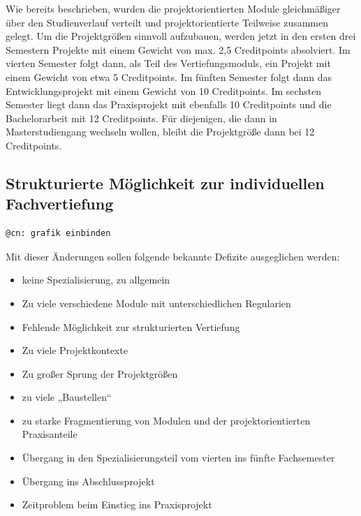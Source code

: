Wie bereits beschrieben, wurden die projektorientierten Module
gleichmäßiger über den Studienverlauf verteilt und projektorientierte
Teilweise zusammen gelegt. Um die Projektgrößen sinnvoll aufzubauen,
werden jetzt in den ersten drei Semestern Projekte mit einem Gewicht von
max. 2,5 Creditpoints absolviert. Im vierten Semester folgt dann, als
Teil des Vertiefungsmoduls, ein Projekt mit einem Gewicht von etwa 5
Creditpoints. Im fünften Semester folgt dann das Entwicklungsprojekt mit
einem Gewicht von 10 Creditpoints. Im sechsten Semester liegt dann das
Praxisprojekt mit ebenfalls 10 Creditpoints und die Bachelorarbeit mit
12 Creditpoints. Für diejenigen, die dann in Masterstudiengang wechseln
wollen, bleibt die Projektgröße dann bei 12 Creditpoints.

\subsection{Strukturierte Möglichkeit zur individuellen
Fachvertiefung}\label{strukturierte-muxf6glichkeit-zur-individuellen-fachvertiefung}

\begin{verbatim}
@cn: grafik einbinden
\end{verbatim}

Mit dieser Änderungen sollen folgende bekannte Defizite ausgeglichen
werden:

\begin{itemize}
\tightlist
\item
  keine Spezialisierung, zu allgemein
\item
  Zu viele verschiedene Module mit unterschiedlichen Regularien
\item
  Fehlende Möglichkeit zur strukturierten Vertiefung
\item
  Zu viele Projektkontexte
\item
  Zu großer Sprung der Projektgrößen
\item
  zu viele „Baustellen``
\item
  zu starke Fragmentierung von Modulen und der projektorientierten
  Praxisanteile
\item
  Übergang in den Spezialisierungsteil vom vierten ins fünfte
  Fachsemester
\item
  Übergang ins Abschlussprojekt
\item
  Zeitproblem beim Einstieg ins Praxisprojekt
\end{itemize}

